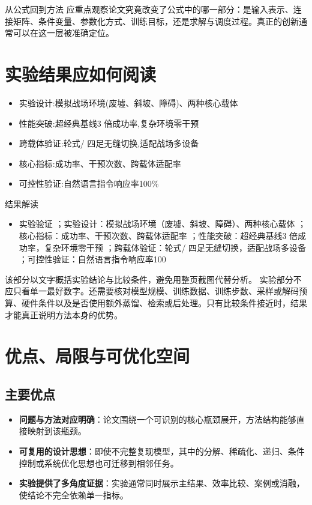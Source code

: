 \documentclass[UTF8,11pt,a4paper]{ctexart}
\newcommand{\term}[1]{\textbf{\textcolor{mainblue}{#1}}}
\begin{document}
\begin{keybox}{从公式回到方法}
应重点观察论文究竟改变了公式中的哪一部分：是输入表示、连接矩阵、条件变量、参数化方式、训练目标，还是求解与调度过程。真正的创新通常可以在这一层被准确定位。
\end{keybox}


\section{实验结果应如何阅读}
\begin{itemize}
\item 实验设计:模拟战场环境(废墟、斜坡、障碍)、两种核心载体
\item 性能突破:超经典基线3 倍成功率,复杂环境零干预
\item 跨载体验证:轮式/ 四足无缝切换,适配战场多设备
\item 核心指标:成功率、干预次数、跨载体适配率
\item 可控性验证:自然语言指令响应率100\%
\end{itemize}

\begin{notebox}{结果解读}
\begin{itemize}
\item 实验验证 ；实验设计：模拟战场环境（废墟、斜坡、障碍）、两种核心载体 ；核心指标：成功率、干预次数、跨载体适配率 ；性能突破：超经典基线3 倍成功率，复杂环境零干预 ；跨载体验证：轮式/ 四足无缝切换，适配战场多设备 ；可控性验证：自然语言指令响应率100\\%
\end{itemize}
\end{notebox}

该部分以文字概括实验结论与比较条件，避免用整页截图代替分析。
实验部分不应只看单一最好数字。还需要核对模型规模、训练数据、训练步数、采样或解码预算、硬件条件以及是否使用额外蒸馏、检索或后处理。只有比较条件接近时，结果才能真正说明方法本身的优势。

\section{优点、局限与可优化空间}
\subsection{主要优点}
\begin{itemize}
\item \term{问题与方法对应明确}：论文围绕一个可识别的核心瓶颈展开，方法结构能够直接映射到该瓶颈。
\item \term{可复用的设计思想}：即使不完整复现模型，其中的分解、稀疏化、递归、条件控制或系统优化思想也可迁移到相邻任务。
\item \term{实验提供了多角度证据}：实验通常同时展示主结果、效率比较、案例或消融，使结论不完全依赖单一指标。
\end{itemize}
\end{document}

